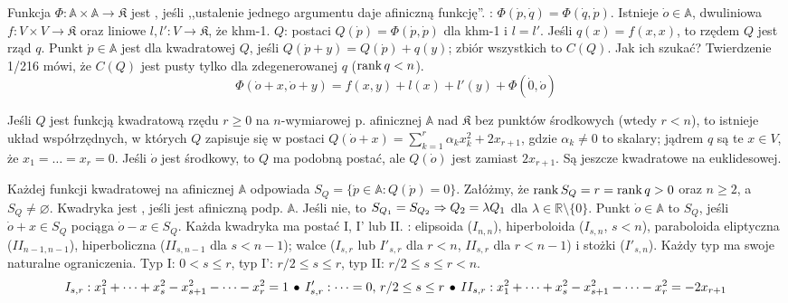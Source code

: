 Funkcja  $\Phi \colon \mathbb A \times \mathbb A \to \mathfrak K$ jest , jeśli ,,ustalenie jednego argumentu daje afiniczną funkcję''.
: $\Phi(\dot p, \dot q) = \Phi(\dot q, \dot p)$.
Istnieje $\dot o \in \mathbb A$, dwuliniowa $f \colon V \times V \to \mathfrak K$ oraz liniowe $l, l' \colon V \to \mathfrak K$, że khm-1.
 $Q$: postaci $Q(\dot p) = \Phi(\dot p, \dot p)$ dla khm-1 i $l = l'$.
Jeśli $q(x) = f(x,x)$, to rzędem $Q$ jest rząd $q$.
Punkt $\dot p \in \mathbb A$ jest  dla kwadratowej $Q$, jeśli $Q (\dot p + y ) = Q(\dot p) + q(y)$; zbiór wszystkich to $C(Q)$.
Jak ich szukać?
Twierdzenie 1/216 mówi, że $C(Q)$ jest pusty tylko dla zdegenerowanej $q$ ($\operatorname{rank} q<n$).
\[
	\Phi(\dot o + x, \dot o + y) = f(x,y) + l(x) + l'(y) + \Phi(\dot 0, \dot o)
\]

Jeśli $Q$ jest funkcją kwadratową rzędu $r \ge 0$ na $n$-wymiarowej p. afinicznej $\mathbb A$ nad $\mathfrak K$ bez punktów środkowych (wtedy $r < n$), to istnieje układ współrzędnych, w których $Q$ zapisuje się w postaci $Q(\dot o + x) = \sum_{k=1}^r \alpha_k x_k^2 + 2x_{r+1}$, gdzie $\alpha_k \neq 0$ to skalary; jądrem $q$ są te $x \in V$, że $x_1 = \dots = x_r = 0$.
Jeśli $\dot o$ jest środkowy, to $Q$ ma podobną postać, ale $Q(\dot o) $ jest zamiast $2 x _{r+1}$.
Są jeszcze kwadratowe na euklidesowej. %

Każdej  funkcji kwadratowej na afinicznej $\mathbb A$ odpowiada  $S_Q = \{\dot{p} \in \mathbb  A : Q(\dot p) = 0\}$.
Załóżmy, że $\operatorname{rank} S_Q = r = \operatorname{rank} q > 0$ oraz $n \ge 2$, a $S_Q \neq \varnothing$.
Kwadryka jest , jeśli jest afiniczną podp. $\mathbb A$.
Jeśli nie, to $S_{Q_1} = S_{Q_2} \Rightarrow Q_2 = \lambda Q_1$ dla $\lambda \in \mathbb R \setminus \{0\}$.
Punkt $\dot o \in \mathbb A$ to  $S_Q$, jeśli $\dot o + x \in S_Q$ pociąga $\dot o - x \in S_Q$.
Każda kwadryka ma postać I, I' lub II.
: elipsoida ($I_{n,n}$), hiperboloida ($I_{s,n}$, $s < n$), paraboloida eliptyczna ($II_{n-1,n-1}$), hiperboliczna ($II_{s, n-1}$ dla $s < n-1$); walce ($I_{s,r}$ lub $I'_{s,r}$ dla $r < n$, $II_{s,r}$ dla $ r< n-1$) i stożki ($I'_{s,n}$).
Każdy typ ma swoje naturalne ograniczenia.
Typ I: $0 < s \le r$, typ I': $r/2 \le s \le r$, typ II: $r/2 \le s \le r < n$.
\[
	I_{s,r} : x_1^2 + \dots + x_s^2 - x_{s+1}^2 - \dots - x_r^2 = 1 \, \bullet \,
	I'_{s,r} : \dots = 0,\, r/2 \le s \le r \, \bullet \,
	II_{s,r} : x_1^2 + \dots + x_s^2 - x_{s+1}^2 - \dots - x_{r}^2 = -2 x_{r+1}
\]

